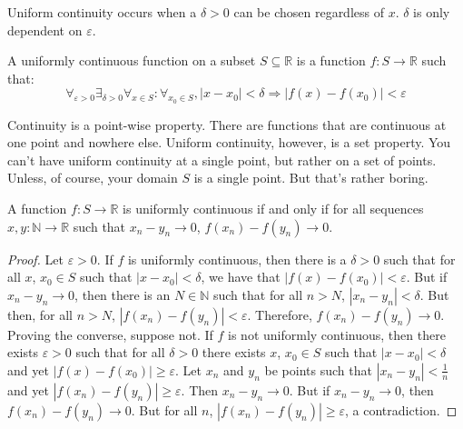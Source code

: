 \documentclass[crop=false,class=book,oneside]{standalone}
\begin{document}
            Uniform continuity occurs when a $\delta>0$ can be
            chosen regardless of $x$. $\delta$ is
            only dependent on $\varepsilon$.
            \begin{definition}
                A uniformly continuous function on a subset
                $S\subseteq\mathbb{R}$
                is a function $f:S\rightarrow\mathbb{R}$ such that:
                \begin{equation*}
                    \forall_{\varepsilon>0}\exists_{\delta>0}
                    \forall_{x\in{S}}:\forall_{x_{0}\in{S}},
                    |x-x_{0}|<\delta
                    \Rightarrow|f(x)-f(x_{0})|<\varepsilon    
                \end{equation*}
            \end{definition}
            Continuity is a point-wise property. There are
            functions that are continuous at one point
            and nowhere else. Uniform continuity, however,
            is a set property. You can't have uniform
            continuity at a single point,
            but rather on a set of points. Unless, of course,
            your domain $S$ is a single point. But that's rather boring.
            \begin{theorem}
                \label{thm:Funct:equiv_def_of_uni_cont}
                A function $f:S\rightarrow\mathbb{R}$
                is uniformly continuous if and only if
                for all sequences $x,y:\mathbb{N}\rightarrow\mathbb{R}$
                such that $x_{n}-y_{n}\rightarrow{0}$,
                $f(x_{n})-f(y_{n})\rightarrow{0}$.
            \end{theorem}
            \begin{proof}
                Let $\varepsilon>0$. If $f$ is uniformly continuous,
                then there is a $\delta>0$ such that for all
                $x$, $x_{0}\in{S}$ such that $|x-x_{0}|<\delta$,
                we have that $|f(x)-f(x_{0})|<\varepsilon$. But if
                $x_{n}-y_{n}\rightarrow{0}$, then there is an
                $N\in\mathbb{N}$ such that for all $n>N$,
                $|x_{n}-y_{n}|<\delta$. But then, for all $n>N$,
                $|f(x_{n})-f(y_{n})|<\varepsilon$. Therefore,
                $f(x_{n})-f(y_{n})\rightarrow{0}$. Proving the
                converse, suppose not. If $f$ is not uniformly
                continuous, then there exists $\varepsilon>0$
                such that for all $\delta>0$ there exists
                $x$, $x_{0}\in{S}$ such that
                $|x-x_{0}|<\delta$ and yet
                $|f(x)-f(x_{0})|\geq{\varepsilon}$. Let
                $x_{n}$ and $y_{n}$ be points such that
                $|x_{n}-y_{n}|<\frac{1}{n}$ and yet
                $|f(x_{n})-f(y_{n})|\geq\varepsilon$. Then
                $x_{n}-y_{n}\rightarrow{0}$. But if
                $x_{n}-y_{n}\rightarrow{0}$, then
                $f(x_{n})-f(y_{n})\rightarrow{0}$. But for all
                $n$, $|f(x_{n})-f(y_{n})|\geq{\varepsilon}$,
                a contradiction.
            \end{proof}
\end{document}
